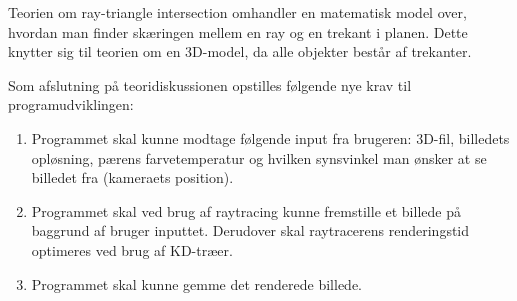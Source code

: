 Teorien om ray-triangle intersection omhandler en matematisk model over, hvordan man finder skæringen mellem en ray og en trekant i planen. Dette knytter sig til teorien om en 3D-model, da alle objekter består af trekanter. 

Som afslutning på teoridiskussionen opstilles følgende nye krav til programudviklingen:
\begin{enumerate}
    \item Programmet skal kunne modtage følgende input fra brugeren: 3D-fil, billedets opløsning, pærens farvetemperatur og hvilken synsvinkel man ønsker at se billedet fra (kameraets position).
    \item Programmet skal ved brug af raytracing kunne fremstille et billede på baggrund af bruger inputtet. Derudover skal raytracerens renderingstid optimeres ved brug af KD-træer.
    \item Programmet skal kunne gemme det renderede billede.
\end{enumerate}
